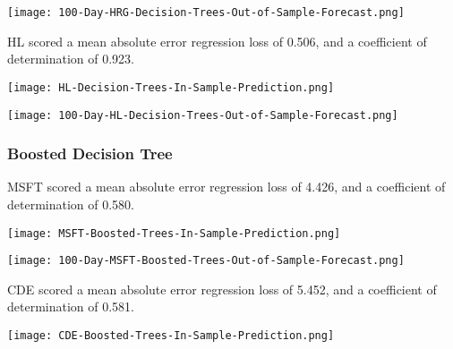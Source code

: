 \begin{center}  
    \texttt{[image: 100-Day-HRG-Decision-Trees-Out-of-Sample-Forecast.png]}
    \label{fig:nonfloat}
\end{center}

HL scored a mean absolute error regression loss of 0.506, and a coefficient of determination of 0.923.

\begin{center}
    \texttt{[image: HL-Decision-Trees-In-Sample-Prediction.png]}
    \label{fig:nonfloat}
\end{center}

\begin{center}  
    \texttt{[image: 100-Day-HL-Decision-Trees-Out-of-Sample-Forecast.png]}
    \label{fig:nonfloat}
\end{center}

\subsubsection{Boosted Decision Tree}
MSFT scored a mean absolute error regression loss of 4.426, and a coefficient of determination of 0.580.

\begin{center}
    \texttt{[image: MSFT-Boosted-Trees-In-Sample-Prediction.png]}
    \label{fig:nonfloat}
\end{center}

\begin{center}  
    \texttt{[image: 100-Day-MSFT-Boosted-Trees-Out-of-Sample-Forecast.png]}
    \label{fig:nonfloat}
\end{center}

CDE scored a mean absolute error regression loss of 5.452, and a coefficient of determination of 0.581.

\begin{center}
    \texttt{[image: CDE-Boosted-Trees-In-Sample-Prediction.png]}
    \label{fig:nonfloat}
\end{center}

